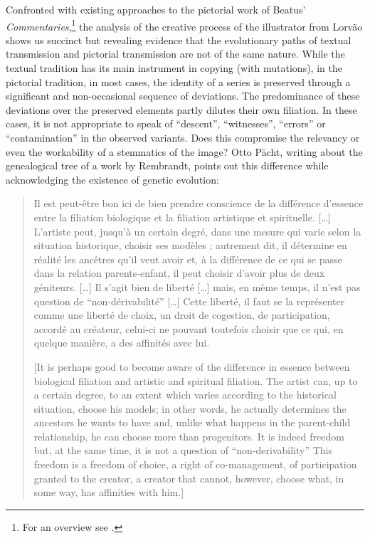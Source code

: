 \begin{paper}
Confronted with existing approaches to the pictorial work of Beatus'
\emph{Commentaries},\footnote{For an overview see \citealp[Vol. I, chap. 3, 31--102]{williams_illustrated_1994}.} the analysis of the creative process of the
illustrator from Lorvão shows us succinct but revealing evidence that
the evolutionary paths of textual transmission and pictorial
transmission are not of the same nature. While the textual tradition has
its main instrument in copying (with mutations), in the pictorial
tradition, in most cases, the identity of a series is preserved through
a significant and non-occasional sequence of deviations. The
predominance of these deviations over the preserved elements partly
dilutes their own filiation. In these cases, it is not appropriate to
speak of ``descent'', ``witnesses'', ``errors'' or ``contamination'' in
the observed variants. Does this compromise the relevancy or even the
workability of a stemmatics of the image? Otto Pächt, writing about the
genealogical tree of a work by Rembrandt, points out this difference
while acknowledging the existence of genetic evolution:

\begin{quote}
Il est peut-être bon ici de bien prendre conscience de la différence
d'essence entre la filiation biologique et la filiation artistique et
spirituelle. [\ldots] L'artiste peut, jusqu'à un certain degré, dans une
mesure qui varie selon la situation historique, choisir ses modèles ;
autrement dit, il détermine en réalité les ancêtres qu'il veut avoir et,
à la différence de ce qui se passe dans la relation parents-enfant, il
peut choisir d'avoir plus de deux géniteurs. [\ldots] Il s'agit bien de
liberté [\ldots] mais, en même temps, il n'est pas question de
``non-dérivabilité'' [\ldots] Cette liberté, il faut se la représenter
comme une liberté de choix, un droit de cogestion, de participation,
accordé au créateur, celui-ci ne pouvant toutefois choisir que ce qui,
en quelque manière, a des affinités avec lui.

\vspace{2em}

{[}It is perhaps good to become aware of the difference in essence
between biological filiation and artistic and spiritual filiation. The artist can, up to a certain degree, to an extent which
varies according to the historical situation, choose his models; in
other words, he actually determines the ancestors he wants to have and,
unlike what happens in the parent-child relationship, he can choose more than progenitors. It is indeed freedom but, at the same
time, it is not a question of ``non-derivability'' This freedom is a
freedom of choice, a right of co-management, of participation granted to the creator, a creator that cannot, however, choose what, in some way, has affinities with him.{]}
\begin{flushright}
    \parencite[135]{pacht_questions_1994}
\end{flushright}
\end{quote}


\end{paper}
